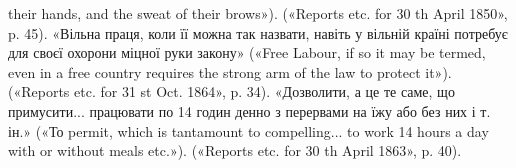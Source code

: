 their hands, and the sweat of their brows»). («Reports etc. for 30 th April
1850», p. 45). «Вільна праця, коли її можна так назвати, навіть у вільній
країні потребує для своєї охорони міцної руки закону» («Free Labour,
if so it may be termed, even in a free country requires the strong arm of
the law to protect it»). («Reports etc. for 31 st Oct. 1864», p. 34). «Дозволити,
а це те саме, що примусити... працювати по 14 годин денно з перервами
на їжу або без них і т. ін.» («То permit, which is tantamount to
compelling... to work 14 hours a day with or without meals etc.»). («Reports
etc. for 30 th April 1863», p. 40).
